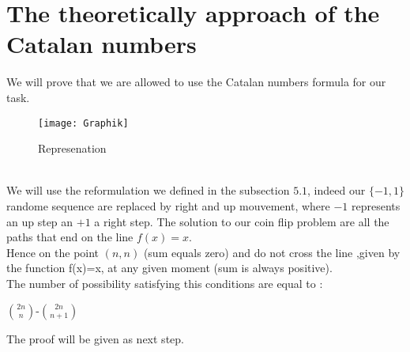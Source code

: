 \documentclass[a4paper,12pt,oneside]{article}
\begin{document}
\newpage
\section{The theoretically approach of the Catalan numbers}
\vspace{0.5cm}
We will prove that we are allowed to use the Catalan numbers formula for our task.
\begin{figure}[h]
\centering
\texttt{[image: Graphik]}
\caption{Represenation}
\end{figure}
\\
We will use the reformulation we defined in the subsection $5.1$, indeed our $\{-1,1\}$ randome sequence are replaced by right and up mouvement, where $-1$ represents an up step an $+1$ a right step. The solution to our coin flip problem are all the paths that end on the line $f(x)=x$.
\\
Hence on the point $(n,n)$  (sum equals zero) and do not cross the line ,given by the function f(x)=x, at any given moment (sum is always positive).\\
The number of possibility satisfying this conditions are equal to : \\
\begin{center}
 $\binom{2n}{n}$-$\binom{2n}{n+1}$
\end{center}
The proof will be given as next step.
\newpage
\end{document}
